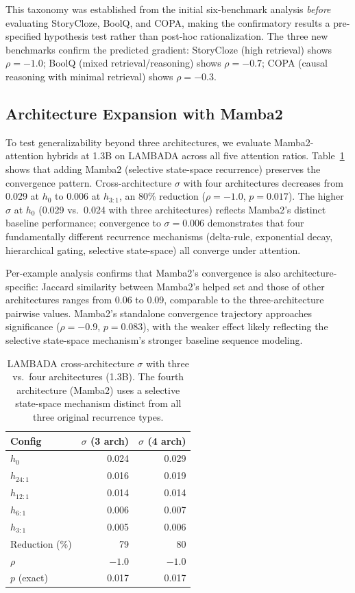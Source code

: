 \documentclass[11pt]{article}
\begin{document}
This taxonomy was established from the initial six-benchmark analysis \textit{before} evaluating StoryCloze, BoolQ, and COPA, making the confirmatory results a pre-specified hypothesis test rather than post-hoc rationalization.
The three new benchmarks confirm the predicted gradient: StoryCloze (high retrieval) shows $\rho = {-}1.0$; BoolQ (mixed retrieval/reasoning) shows $\rho = {-}0.7$; COPA (causal reasoning with minimal retrieval) shows $\rho = {-}0.3$.

\subsection{Architecture Expansion with Mamba2}

To test generalizability beyond three architectures, we evaluate Mamba2-attention hybrids at 1.3B on LAMBADA across all five attention ratios.
Table~\ref{tab:fourarch} shows that adding Mamba2 (selective state-space recurrence) preserves the convergence pattern.
Cross-architecture $\sigma$ with four architectures decreases from 0.029 at $h_0$ to 0.006 at $h_{3:1}$, an 80\% reduction ($\rho = {-}1.0$, $p = 0.017$).
The higher $\sigma$ at $h_0$ (0.029 vs.\ 0.024 with three architectures) reflects Mamba2's distinct baseline performance; convergence to $\sigma = 0.006$ demonstrates that four fundamentally different recurrence mechanisms (delta-rule, exponential decay, hierarchical gating, selective state-space) all converge under attention.

Per-example analysis confirms that Mamba2's convergence is also architecture-specific: Jaccard similarity between Mamba2's helped set and those of other architectures ranges from 0.06 to 0.09, comparable to the three-architecture pairwise values.
Mamba2's standalone convergence trajectory approaches significance ($\rho = {-}0.9$, $p = 0.083$), with the weaker effect likely reflecting the selective state-space mechanism's stronger baseline sequence modeling.

\begin{table}[t]
\centering
\caption{LAMBADA cross-architecture $\sigma$ with three vs.\ four architectures (1.3B). The fourth architecture (Mamba2) uses a selective state-space mechanism distinct from all three original recurrence types.}
\label{tab:fourarch}
\small
\begin{tabular}{lrr}
\toprule
Config & $\sigma$ (3 arch) & $\sigma$ (4 arch) \\
\midrule
$h_0$ & 0.024 & 0.029 \\
$h_{24:1}$ & 0.016 & 0.019 \\
$h_{12:1}$ & 0.014 & 0.014 \\
$h_{6:1}$ & 0.006 & 0.007 \\
$h_{3:1}$ & 0.005 & 0.006 \\
\midrule
Reduction (\%) & 79 & 80 \\
$\rho$ & ${-}1.0$ & ${-}1.0$ \\
$p$ (exact) & 0.017 & 0.017 \\
\bottomrule
\end{tabular}
\end{table}
\end{document}
